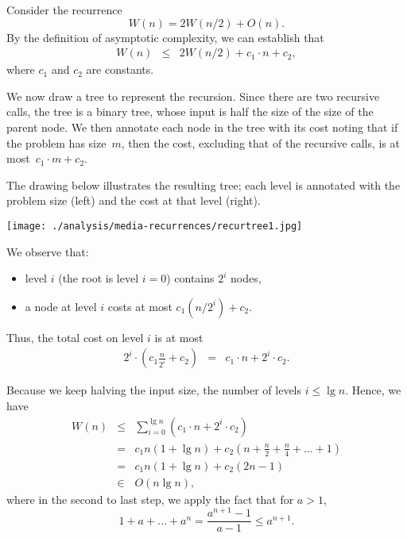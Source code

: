 \begin{example}
Consider the recurrence
$$
W(n) = 2W(n/2) + O(n).
$$
%
%
By the definition of asymptotic complexity, we
can establish that
\begin{eqnarray*}
  W(n) &\leq& 2W(n/2) + c_1\cdot n + c_2,
\end{eqnarray*}
where $c_1$ and $c_2$ are constants.  
%

We now draw a tree to represent the recursion. Since there are two
recursive calls, the tree is a binary tree, whose input is half the
size of the size of the parent node.
%
We then annotate each node in the tree with its cost noting that if
the problem has size~$m$, then the cost, excluding that of the
recursive calls, is at most~$c_1 \cdot m + c_2$.  
%

The drawing below illustrates the resulting tree; each level is
annotated with the problem size (left) and the cost at that level
(right).

\begin{center}
\texttt{[image: ./analysis/media-recurrences/recurtree1.jpg]}
\end{center}

We observe that:
\begin{itemize}
\item  level $i$ (the root is level $i=0$) contains $2^i$
nodes, 
\item a node at level $i$ costs at most $c_1 (n/2^i) + c_2$.
\end{itemize}
%
Thus, the total cost on level $i$ is at most
\begin{eqnarray*}
2^i \cdot \left(c_1 \frac{n}{2^i} + c_2\right) &=& c_1 \cdot n + 2^i \cdot c_2.
\end{eqnarray*}

Because we keep halving the input size, the number of levels $i \le
\lg n$.  Hence, we have
\begin{eqnarray*}
  W(n) &\leq& \sum_{i=0}^{\lg n} \left(c_1 \cdot n + 2^i \cdot c_2\right) \\
  &=& c_1 n (1+\lg n)+ c_2(n +\tfrac{n}{2} + \tfrac{n}{4} + \dots + 1)\\
  &=& c_1 n (1+\lg n)+ c_2(2n - 1)\\
  &\in& O(n\lg n),
\end{eqnarray*}
where in the second to last step, we apply the fact that for $a > 1$,
\begin{equation*}
1 + a + \dots + a^{n} = \frac{a^{n+1} - 1}{a-1} \leq a^{n+1}.
\end{equation*}

\end{example}


